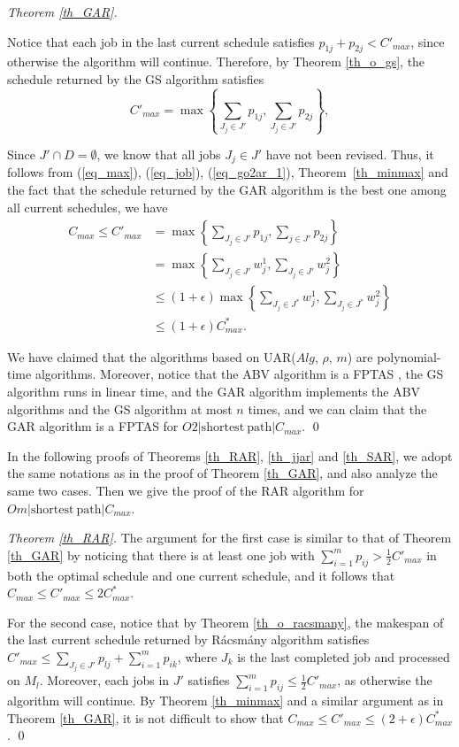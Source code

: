\documentclass{llncs}
\newcommand{\be}{\begin{equation}}
\newcommand{\ee}{\end{equation}}
\numberwithin{subcase}{case}
\begin{document}
\begin{proof}[Theorem \ref{th_GAR}]
\begin{case}
Notice that each job in the last current schedule satisfies $p_{1j} + p_{2j} < C'_{max}$, since otherwise the algorithm will continue. Therefore, by Theorem \ref{th_o_gs}, the schedule returned by the GS algorithm satisfies
\be
C'_{max} = \max\left\{\sum_{J_j\in J'}p_{1j}, \sum_{J_j\in J'}p_{2j}\right\},\label{eq_go2ar_1}
\ee

Since $J' \cap D = \emptyset$, we know that all jobs $J_j\in J'$ have not been revised. Thus,
it follows from (\ref{eq_max}), (\ref{eq_job}), (\ref{eq_go2ar_1}), Theorem~\ref{th_minmax} and the fact that the schedule returned by the GAR algorithm is the best one among all current schedules, we have
\begin{equation*}\label{eq_om}
\begin{split}
C_{max} \leq C'_{max} &  = \max\left\{\sum_{J_j\in J'}p_{1j}, \sum_{j\in J'}p_{2j}\right\} \\
& = \max\left\{\sum_{J_j\in J'}w^1_{j}, \sum_{J_j\in J'}w^2_{j}\right\}\\
& \leq (1+\epsilon)\max \left\{\sum_{J_j\in J^*}w^1_j, \sum_{J_j\in J^*}w^2_{j}\right\}\\
&\leq(1+\epsilon)C^*_{max}.
\end{split}
\end{equation*}
\end{case}

We have claimed that the algorithms based on UAR($Alg$, $\rho$, $m$) are polynomial-time algorithms. Moreover, notice that the ABV algorithm is a FPTAS \cite{ABV06}, the GS algorithm runs in linear time, and the GAR algorithm implements the ABV algorithms and the GS algorithm at most $n$ times, and we can claim that the GAR algorithm is a FPTAS for $O2|\mathrm{shortest}~\mathrm{path}|C_{max}$.
\qed
\end{proof}

In the following proofs of Theorems \ref{th_RAR}, \ref{th_jjar} and \ref{th_SAR}, we adopt the same notations as in the proof of Theorem \ref{th_GAR}, and also analyze the same two cases. Then we give the proof of the RAR algorithm for $Om|\mathrm{shortest}~\mathrm{path}|C_{max}$.

\begin{proof}[Theorem \ref{th_RAR}]
The argument for the first case is similar to that of Theorem \ref{th_GAR} by noticing that there is at least one job with $\sum_{i=1}^mp_{ij} > \frac{1}{2} C'_{max}$ in both the optimal schedule and one current schedule, and it follows that $C_{max}\leq C'_{max} \leq 2C^*_{max}$.

For the second case, notice that by Theorem \ref{th_o_racsmany}, the makespan of the last current schedule returned by R{\'a}csm{\'a}ny algorithm satisfies $C'_{max} \leq \sum_{J_j\in J'}p_{lj} + \sum_{i = 1}^m p_{ik}$, where $J_k$ is the last completed job and processed on $M_l$. Moreover, each jobs in $J'$ satisfies $\sum_{i=1}^mp_{ij} \leq \frac{1}{2} C'_{max}$, as otherwise the algorithm will continue. By Theorem \ref{th_minmax} and a similar argument as in Theorem \ref{th_GAR}, it is not difficult to show that $C_{max}\leq C'_{max} \leq (2+\epsilon) C^*_{max}$.
\qed
\end{proof}
\end{document}

